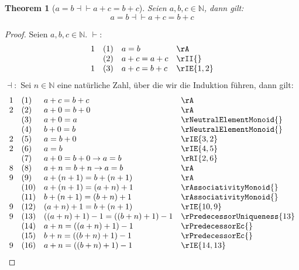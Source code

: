 \documentclass{book}
\theoremstyle{plain}
\newtheorem{theorem}{Theorem}
\theoremstyle{remark}
\theoremstyle{definition}
\begin{document}
\label{aEqualsbEqvaPluscEqualsbPlusc}
\begin{theorem}[\( a=b\dashv \vdash a+c=b+c\)]
Seien \(a,b,c\in\mathbb{N}\), dann gilt:
\[a=b\dashv\vdash a+c=b+c\]
\end{theorem}
\begin{proof}
Seien \(a,b,c\in\mathbb{N}\).
\(\vdash:\)
        \[
	\begin{array}{llll}
            1       &  (1)  & a=b & \rA \\
                    &  (2)  & a+c=a+c & \rII{} \\
            1       &  (3)  & a+c=b+c & \rIE{1,2} \\       
	\end{array}
	\]
 \(\dashv:\)
        Sei \(n\in\mathbb{N}\) eine natürliche Zahl, über die wir die Induktion führen, dann gilt:
        \[
	\begin{array}{llll}
            1       &  (1)  & a+c=b+c & \rA \\
            2       &  (2)  & a+0=b+0 & \rA \\
                    &  (3)  & a+0=a & \rNeutralElementMonoid{} \\
                    &  (4)  & b+0=b & \rNeutralElementMonoid{}  \\
            2       &  (5)  & a=b+0 & \rIE{3,2} \\       
            2       &  (6)  & a=b & \rIE{4,5} \\   
                    &  (7)  & a+0=b+0\rightarrow a=b & \rRI{2,6} \\
            8       &  (8)  & a+n=b+n\rightarrow a=b & \rA \\  
            9       &  (9)  & a+(n+1)=b+(n+1) & \rA \\  
                    &  (10)  & a+(n+1)=(a+n)+1 & \rAssociativityMonoid{} \\
                    &  (11)  & b+(n+1)=(b+n)+1 & \rAssociativityMonoid{} \\
            9       &  (12)  & (a+n)+1=b+(n+1) & \rIE{10,9} \\
            9       &  (13)  & ((a+n)+1)-1=((b+n)+1)-1 & \rPredecessorUniqueness{13}\\ 
                    &  (14)  & a+n=((a+n)+1)-1 & \rPredecessorEc{}\\
                    &  (15)  & b+n=((b+n)+1)-1 & \rPredecessorEc{}\\
            9       &  (16)  & a+n=((b+n)+1)-1 & \rIE{14,13}\\ 

\end{array}\]
\end{proof}
\end{document}
